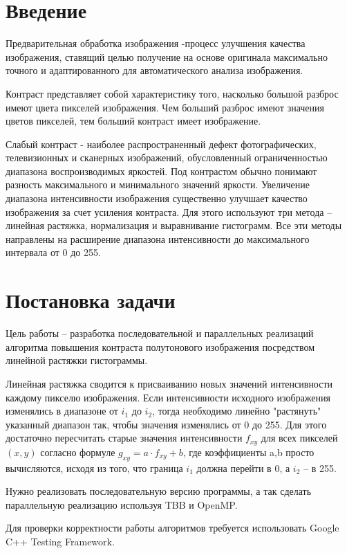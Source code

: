 \documentclass{report}
\begin{document}
\section*{Введение}
Предварительная обработка изображения -процесс улучшения качества изображения, ставящий целью получение на основе оригинала максимально точного и адаптированного для автоматического анализа изображения.
\par Контраст представляет собой характеристику того, насколько большой разброс имеют цвета пикселей изображения. Чем больший разброс имеют значения цветов пикселей, тем больший контраст имеет изображение.
\par Слабый контраст - наиболее распространенный дефект фотографических, телевизионных и сканерных изображений, обусловленный ограниченностью диапазона воспроизводимых яркостей. Под контрастом обычно понимают разность максимального и минимального значений яркости. Увеличение диапазона интенсивности изображения существенно улучшает качество изображения за счет усиления контраста. Для этого используют три метода – линейная растяжка, нормализация и выравнивание гистограмм. Все эти методы направлены на расширение диапазона интенсивности до максимального интервала от 0 до 255.
\newpage

\section*{Постановка задачи}
\par Цель работы – разработка последовательной и параллельных реализаций алгоритма повышения контраста полутонового изображения посредством линейной растяжки гистограммы.
\par Линейная растяжка сводится к присваиванию новых значений интенсивности каждому пикселю изображения. Если интенсивности исходного изображения изменялись в диапазоне от $i_{1}$ до $i_{2}$, тогда необходимо линейно "растянуть" указанный диапазон так, чтобы значения изменялись от 0 до 255. Для этого достаточно пересчитать старые значения интенсивности $f_{xy}$ для всех пикселей $(x,y)$ согласно формуле $g_{xy} = a \cdot f_{xy} + b$, где коэффициенты a,b просто вычисляются, исходя из того, что граница $i_{1}$ должна перейти в 0, а $i_{2}$ – в 255.
\par Нужно реализовать последовательную версию программы, а так сделать параллельную реализацию используя TBB и OpenMP.
\par Для проверки корректности работы алгоритмов требуется использовать Google C++ Testing Framework.
\newpage
\end{document}
